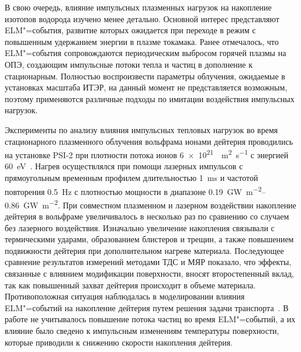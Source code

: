 В свою очередь, влияние импульсных плазменных нагрузок на накопление изотопов водорода изучено менее детально. Основной интерес представляют ELM"=события, развитие которых ожидается при переходе в режим с повышенным удержанием энергии в плазме токамака. Ранее отмечалось, что ELM"=события сопровождаются периодическим выбросом горячей плазмы на ОПЭ, создающим импульсные потоки тепла и частиц в дополнение к стационарным. Полностью воспроизвести параметры облучения, ожидаемые в установках масштаба ИТЭР, на данный момент не представляется возможным, поэтому применяются различные подходы по имитации воздействия импульсных нагрузок.

Эксперименты по анализу влияния импульсных тепловых нагрузок во время стационарного плазменного облучения вольфрама ионами дейтерия проводились на установке PSI-2 при плотности потока ионов \SI{6e21}{\per\meter\squared\per\second} с энергией \SI{60}{\electronvolt}~\cite{Huber2016_1, Huber2016_2}. Нагрев осуществлялся при помощи лазерных импульсов с прямоугольным временным профилем длительностью \SI{1}{\milli\second} и частотой повторения \SI{0.5}{\hertz} с плотностью мощности в диапазоне \SIrange{0.19}{0.86}{\giga\watt\per\meter\squared}. При совместном плазменном и лазерном воздействии накопление дейтерия в вольфраме увеличивалось в несколько раз по сравнению со случаем без лазерного воздействия. Изначально увеличение накопления связывали с термическими ударами, образованием блистеров и трещин, а также повышением подвижности дейтерия при дополнительном нагреве материала. Последующее сравнение результатов измерений методами ТДС и МЯР показало, что эффекты, связанные с влиянием модификации поверхности, вносят второстепенный вклад, так как повышенный захват дейтерия происходит в объеме материала. Противоположная ситуация наблюдалась в моделировании влияния ELM"=событий на накопление дейтерия путем решения задачи транспорта~\cite{Hu2015}. В работе не учитывалось повышение потока частиц во время ELM"=событий, а их влияние было сведено к импульсным изменениям температуры поверхности, которые приводили к снижению скорости накопления дейтерия.

